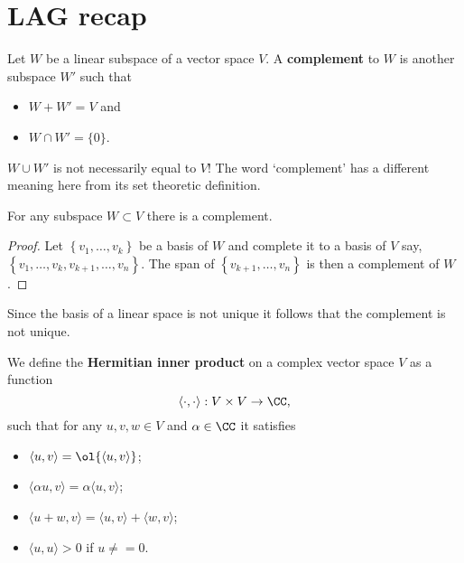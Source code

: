 \documentclass[12pt, a4paper]{article}
\begin{document}
\section{LAG recap}

\begin{definition}
    Let \(W\) be a linear subspace of a vector space \(V\). A \textbf{complement} to \(W\) is another subspace \(W'\) such that 
    \begin{itemize}
        \item \(W+W'=V\) and
        \item \(W\cap W'= \{0\}\).
    \end{itemize}
\end{definition}

\begin{mdremark}
    \(W \cup W'\)  is not necessarily equal to \(V\)! The word `complement' has a different meaning here from its set theoretic definition.
\end{mdremark}

\begin{mdremark}
    For any subspace \(W \subset V\) there is a complement.
    \begin{proof}
        Let \(\left\{ v_1,\ldots,v_k \right\}\) be a basis of \(W\) and complete it to a basis of \(V\) say, \\ \(\left\{ v_1,\ldots,v_k,v_{k+1},\ldots,v_n \right\}\). The span of \(\left\{ v_{k+1},\ldots,v_n \right\}\) is then a complement of \(W\).
    \end{proof}
    Since the basis of a linear space is not unique it follows that the complement is not unique.
\end{mdremark}

\begin{definition}
    We define the \textbf{Hermitian inner product} on a complex vector space \(V\) as a function 
    \[\langle \cdot, \cdot \rangle : V \times V \to \CC,\]
    such that for any \(u,v,w \in V\) and \(\alpha \in \CC\) it satisfies 
    \begin{itemize}
        \item \(\langle u,v \rangle = \ol{\langle u,v \rangle}\);
        \item \(\langle \alpha u,v \rangle = \alpha\langle u,v \rangle\);
        \item \(\langle u+w,v \rangle = \langle u,v \rangle+\langle w,v \rangle\);
        \item \(\langle u,u \rangle >0\) if \(u\neq =0\).
    \end{itemize}
\end{definition}
\end{document}
